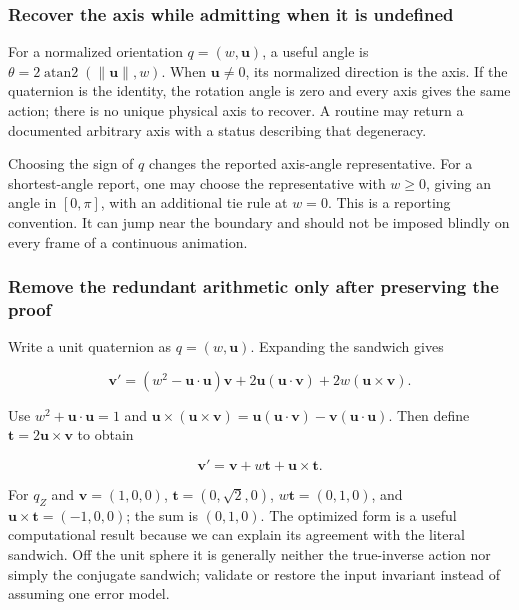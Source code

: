 \subsubsection{Recover the axis while admitting when it is undefined}\label{recover-the-axis-while-admitting-when-it-is-undefined}

For a normalized orientation \(q=(w,\mathbf u)\), a useful angle is \(\theta=2\operatorname{atan2}(\|\mathbf u\|,w)\). When \(\mathbf u\ne0\), its normalized direction is the axis. If the quaternion is the identity, the rotation angle is zero and every axis gives the same action; there is no unique physical axis to recover. A routine may return a documented arbitrary axis with a status describing that degeneracy.

Choosing the sign of \(q\) changes the reported axis-angle representative. For a shortest-angle report, one may choose the representative with \(w\ge0\), giving an angle in \([0,\pi]\), with an additional tie rule at \(w=0\). This is a reporting convention. It can jump near the boundary and should not be imposed blindly on every frame of a continuous animation.

\subsubsection{Remove the redundant arithmetic only after preserving the proof}\label{remove-the-redundant-arithmetic-only-after-preserving-the-proof}

Write a unit quaternion as \(q=(w,\mathbf u)\). Expanding the sandwich gives

\[
\mathbf v'=(w^2-\mathbf u\cdot\mathbf u)\mathbf v
+2\mathbf u(\mathbf u\cdot\mathbf v)
+2w(\mathbf u\times\mathbf v).
\]

Use \(w^2+\mathbf u\cdot\mathbf u=1\) and \(\mathbf u\times(\mathbf u\times\mathbf v)=\mathbf u(\mathbf u\cdot\mathbf v)-\mathbf v(\mathbf u\cdot\mathbf u)\). Then define \(\mathbf t=2\mathbf u\times\mathbf v\) to obtain

\[
\mathbf v'=\mathbf v+w\mathbf t+\mathbf u\times\mathbf t.
\]

For \(q_Z\) and \(\mathbf v=(1,0,0)\), \(\mathbf t=(0,\sqrt2,0)\), \(w\mathbf t=(0,1,0)\), and \(\mathbf u\times\mathbf t=(-1,0,0)\); the sum is \((0,1,0)\). The optimized form is a useful computational result because we can explain its agreement with the literal sandwich. Off the unit sphere it is generally neither the true-inverse action nor simply the conjugate sandwich; validate or restore the input invariant instead of assuming one error model.

